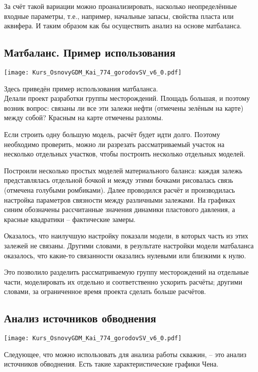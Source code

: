 \documentclass[main.tex]{subfiles}
\begin{document}
За счёт такой вариации можно проанализировать, насколько неопределённые входные параметры, т.е., например, начальные запасы, свойства пласта или аквифера.
И таким образом как бы осуществить анализ на основе матбаланса.

\subsection{Матбаланс. Пример использования}

\texttt{[image: Kurs\_OsnovyGDM\_Kai\_774\_gorodovSV\_v6\_0.pdf]}

Здесь приведён пример использования матбаланса.
\\

Делали проект разработки группы месторождений.
Площадь большая, и поэтому возник вопрос: связаны ли все эти залежи нефти (отмечены зелёным на карте) между собой?
Красным на карте отмечены разломы.

Если строить одну большую модель, расчёт будет идти долго. Поэтому необходимо проверить, можно ли разрезать рассматриваемый участок на несколько отдельных участков, чтобы построить несколько отдельных моделей.

Построили несколько простых моделей материального баланса: каждая залежь представлялась отдельной бочкой и между этими бочками рисовалась связь (отмечена голубыми ромбиками). Далее проводился расчёт и производилась настройка параметров связности между различными залежами.
На графиках синим обозначены рассчитанные значения динамики пластового давления, а красные квадратики -- фактические замеры.

Оказалось, что наилучшую настройку показали модели, в которых часть из этих залежей не связаны.
Другими словами, в результате настройки модели матбаланса оказалось, что какие-то связанности оказались нулевыми или близкими к нулю.

Это позволило разделить рассматриваемую группу месторождений на отдельные части, моделировать их отдельно и соответственно ускорить расчёты; другими словами, за ограниченное время проекта сделать больше расчётов.

\subsection{Анализ источников обводнения}

\texttt{[image: Kurs\_OsnovyGDM\_Kai\_774\_gorodovSV\_v6\_0.pdf]}

Следующее, что можно использовать для анализа работы скважин, -- это анализ источников обводнения.
Есть такие характеристические графики Чена.
\\
\end{document}
